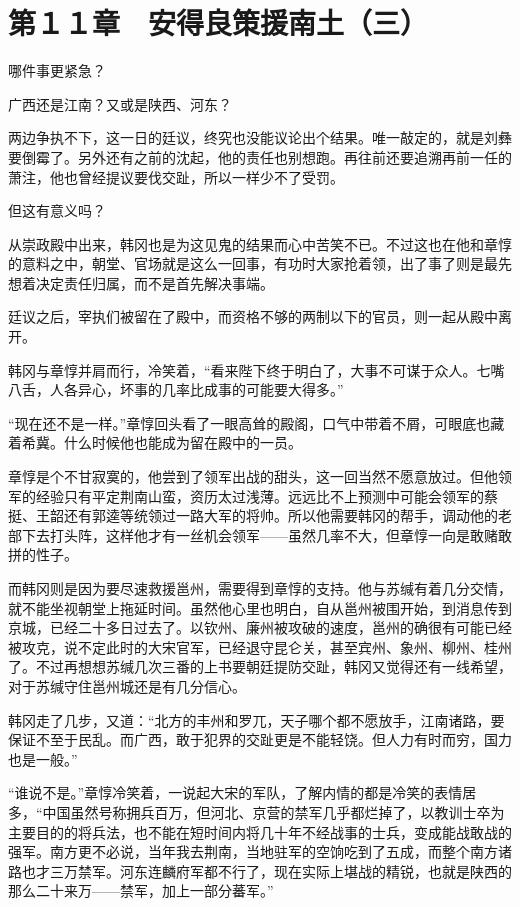 \section{第１１章　安得良策援南土（三）}

哪件事更紧急？

广西还是江南？又或是陕西、河东？

两边争执不下，这一日的廷议，终究也没能议论出个结果。唯一敲定的，就是刘彝要倒霉了。另外还有之前的沈起，他的责任也别想跑。再往前还要追溯再前一任的萧注，他也曾经提议要伐交趾，所以一样少不了受罚。

但这有意义吗？

从崇政殿中出来，韩冈也是为这见鬼的结果而心中苦笑不已。不过这也在他和章惇的意料之中，朝堂、官场就是这么一回事，有功时大家抢着领，出了事了则是最先想着决定责任归属，而不是首先解决事端。

廷议之后，宰执们被留在了殿中，而资格不够的两制以下的官员，则一起从殿中离开。

韩冈与章惇并肩而行，冷笑着，“看来陛下终于明白了，大事不可谋于众人。七嘴八舌，人各异心，坏事的几率比成事的可能要大得多。”

“现在还不是一样。”章惇回头看了一眼高耸的殿阁，口气中带着不屑，可眼底也藏着希冀。什么时候他也能成为留在殿中的一员。

章惇是个不甘寂寞的，他尝到了领军出战的甜头，这一回当然不愿意放过。但他领军的经验只有平定荆南山蛮，资历太过浅薄。远远比不上预测中可能会领军的蔡挺、王韶还有郭逵等统领过一路大军的将帅。所以他需要韩冈的帮手，调动他的老部下去打头阵，这样他才有一丝机会领军——虽然几率不大，但章惇一向是敢赌敢拼的性子。

而韩冈则是因为要尽速救援邕州，需要得到章惇的支持。他与苏缄有着几分交情，就不能坐视朝堂上拖延时间。虽然他心里也明白，自从邕州被围开始，到消息传到京城，已经二十多日过去了。以钦州、廉州被攻破的速度，邕州的确很有可能已经被攻克，说不定此时的大宋官军，已经退守昆仑关，甚至宾州、象州、柳州、桂州了。不过再想想苏缄几次三番的上书要朝廷提防交趾，韩冈又觉得还有一线希望，对于苏缄守住邕州城还是有几分信心。

韩冈走了几步，又道：“北方的丰州和罗兀，天子哪个都不愿放手，江南诸路，要保证不至于民乱。而广西，敢于犯界的交趾更是不能轻饶。但人力有时而穷，国力也是一般。”

“谁说不是。”章惇冷笑着，一说起大宋的军队，了解内情的都是冷笑的表情居多，“中国虽然号称拥兵百万，但河北、京营的禁军几乎都烂掉了，以教训士卒为主要目的的将兵法，也不能在短时间内将几十年不经战事的士兵，变成能战敢战的强军。南方更不必说，当年我去荆南，当地驻军的空饷吃到了五成，而整个南方诸路也才三万禁军。河东连麟府军都不行了，现在实际上堪战的精锐，也就是陕西的那么二十来万——禁军，加上一部分蕃军。”

